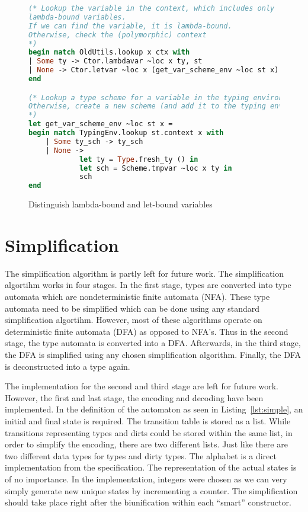 \begin{figure}
\caption{Distinguish lambda-bound and let-bound variables}
\label{lst:var}
\begin{lstlisting}[language=Caml]
(* Lookup the variable in the context, which includes only
lambda-bound variables.
If we can find the variable, it is lambda-bound.
Otherwise, check the (polymorphic) context 
*)
begin match OldUtils.lookup x ctx with
| Some ty -> Ctor.lambdavar ~loc x ty, st
| None -> Ctor.letvar ~loc x (get_var_scheme_env ~loc st x), st
end

(* Lookup a type scheme for a variable in the typing environment
Otherwise, create a new scheme (and add it to the typing environment)
*)
let get_var_scheme_env ~loc st x =
begin match TypingEnv.lookup st.context x with
    | Some ty_sch -> ty_sch
    | None -> 
            let ty = Type.fresh_ty () in
            let sch = Scheme.tmpvar ~loc x ty in
            sch
end
\end{lstlisting}
\end{figure}

\section{Simplification}
The simplification algorithm is partly left for future work. The simplification algortihm works in four stages. In the first stage, types are converted into type automata which are nondeterministic finite automata (NFA). These type automata need to be simplified which can be done using any standard simplification algortihm. However, most of these algorithms operate on deterministic finite automata (DFA) as opposed to NFA's. Thus in the second stage, the type automata is converted into a DFA. Afterwards, in the third stage, the DFA is simplified using any chosen simplification algorithm. Finally, the DFA is deconstructed into a type again.

The implementation for the second and third stage are left for future work. However, the first and last stage, the encoding and decoding have been implemented. In the definition of the automaton as seen in Listing~\ref{lst:simple}, an initial and final state is required. The transition table is stored as a list. While transitions representing types and dirts could be stored within the same list, in order to simplify the encoding, there are two different lists. Just like there are two different data types for types and dirty types. The alphabet is a direct implementation from the specification. The representation of the actual states is of no importance. In the implementation, integers were chosen as we can very simply generate new unique states by incrementing a counter. The simplification should take place right after the biunification within each ``smart'' constructor. 


